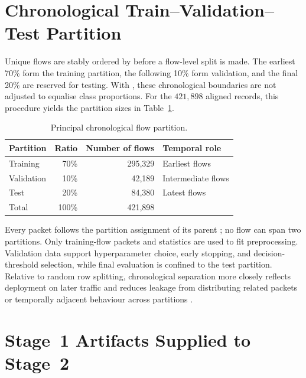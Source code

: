 \documentclass[11pt,fleqn]{report}
\begin{document}
\section{Chronological Train--Validation--Test Partition}
\label{subsec:chronological_partition}

Unique flows are stably ordered by  before a flow-level split is made. The earliest 70\% form the training partition, the following 10\% form validation, and the final 20\% are reserved for testing. With , these chronological boundaries are not adjusted to equalise class proportions. For the $421{,}898$ aligned records, this procedure yields the partition sizes in Table~\ref{tab:chronological_split}.

\begin{table}[H]
    \centering
    \caption{Principal chronological flow partition.}
    \label{tab:chronological_split}
    \begin{tabular}{@{}lrrl@{}}
        \toprule
        Partition & Ratio & Number of flows & Temporal role \\
        \midrule
        Training & 70\% & 295,329 & Earliest flows \\
        Validation & 10\% & 42,189 & Intermediate flows \\
        Test & 20\% & 84,380 & Latest flows \\
        \midrule
        Total & 100\% & 421,898 & \\
        \bottomrule
    \end{tabular}
\end{table}

Every packet follows the partition assignment of its parent ; no flow can span two partitions. Only training-flow packets and statistics are used to fit preprocessing. Validation data support hyperparameter choice, early stopping, and decision-threshold selection, while final evaluation is confined to the test partition. Relative to random row splitting, chronological separation more closely reflects deployment on later traffic and reduces leakage from distributing related packets or temporally adjacent behaviour across partitions \cite{SommerPaxson2010,Arp2022DosDonts}.

\section{Stage~1 Artifacts Supplied to Stage~2}
\label{subsec:stage2_artifacts}
\end{document}
